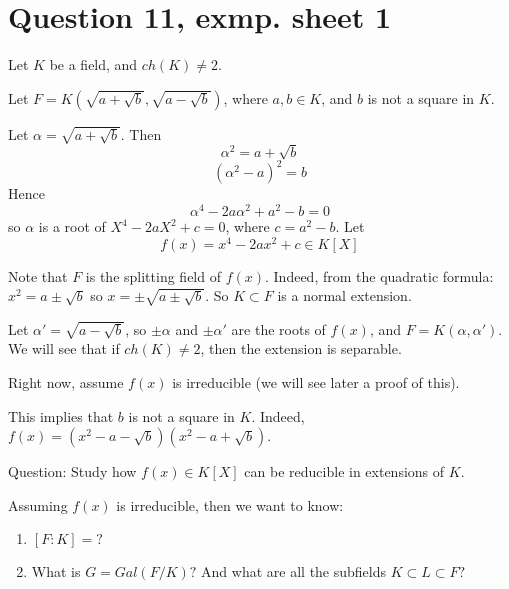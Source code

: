 \documentclass{article}
\theoremstyle{definition}
\theoremstyle{plain}%
\theoremstyle{remark}
\begin{document}
\appendix

\section{}

  

\section{Question 11, exmp. sheet 1}

Let $K$ be a field, and $ch(K) \ne 2$.

Let $F = K(\sqrt{a + \sqrt{b}}, \sqrt{a - \sqrt{b}})$, where $a,b \in K$, and $b$ is not a square in $K$.

Let $\alpha = \sqrt{a + \sqrt{b}}$. Then \[\alpha^2 = a + \sqrt{b}\] \[(\alpha^2 - a)^2 = b\] Hence \[\alpha^4 - 2a\alpha^2 +a^2 - b = 0\] so $\alpha$ is a root of $X^4 - 2aX^2 + c = 0$, where $c = a^2 - b$. Let \[f(x) = x^4 - 2ax^2 + c  \in K[X]\]

Note that $F$ is the splitting field of $f(x)$. Indeed, from the quadratic formula: $x^2 = a \pm \sqrt{b}$ so $x = \pm \sqrt{a \pm \sqrt{b}}$. So $K \subset F$ is a normal extension.

Let $\alpha' = \sqrt{a - \sqrt{b}}$, so $\pm \alpha$ and $\pm \alpha'$ are the roots of $f(x)$, and $F = K(\alpha, \alpha')$. We will see that if $ch(K) \ne 2$, then the extension is separable.

Right now, assume $f(x)$ is irreducible (we will see later a proof of this).

This implies that $b$ is not a square in $K$. Indeed, $f(x) = (x^2 - a -\sqrt{b})(x^2 - a + \sqrt{b})$.

Question: Study how $f(x) \in K[X]$ can be reducible in extensions of $K$.

Assuming $f(x)$ is irreducible, then we want to know:
\begin{enumerate}
    \item $[F : K] = ?$
    \item What is $G = Gal(F / K)?$ And what are all the subfields $K \subset L \subset F?$
\end{enumerate}
\end{document}
